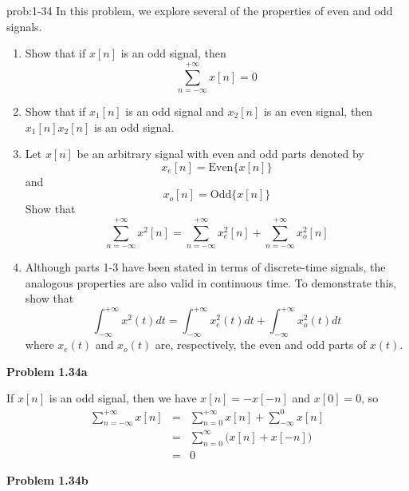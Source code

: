 \documentclass[koma,a4paper,utopia,12pt,listings-color,microtype,paralist,colorlinks,urlcolor=red]{org-article}
\begin{document}
\begin{prob}[]{prob:1-34}
In this problem, we explore several of the properties of even and odd
signals.

\begin{enumerate}
\item Show that if \(x[n]\) is an odd signal, then
\begin{equation*}
\sum_{n=-\infty}^{+\infty} x[n] =0
\end{equation*}
\item Show that if \(x_{1}[n]\) is an odd signal and \(x_{2}[n]\) is an even
signal, then \(x_{1}[n]x_{2}[n]\) is an odd signal.
\item Let \(x[n]\) be an arbitrary signal with even and odd parts denoted by
\begin{equation*}
x_{e}[n] = \mathrm{Even}\{ x[n] \}
\end{equation*}
and
\begin{equation*}
x_{o}[n] = \mathrm{Odd} \{ x[n] \}
\end{equation*}
Show that
\begin{equation*}
\sum_{n=-\infty}^{+\infty} x^{2}[n] = \sum_{n=-\infty}^{+\infty} x_{e}^{2}[n] +  \sum_{n=-\infty}^{+\infty} x_{o}^{2}[n]
\end{equation*}
\item Although parts 1-3 have been stated in terms of discrete-time
signals, the analogous properties are also valid in continuous time. To
demonstrate this, show that
\begin{equation*}
\int_{-\infty}^{+\infty}x^{2}(t)dt = \int_{-\infty}^{+\infty} x_{e}^{2}(t)dt + \int_{-\infty}^{+\infty} x_{o}^{2}(t)dt
\end{equation*}
where \(x_{e}(t)\) and \(x_{o}(t)\) are, respectively, the even and odd
parts of \(x(t)\).
\end{enumerate}
\label{prob:1-34}
\end{prob}

\textbf{Problem 1.34a}

If \(x[n]\) is an odd signal, then we have \(x[n] = -x[-n]\) and \(x[0]=0\), so
\begin{eqnarray*}
\sum_{n=-\infty}^{+\infty} x[n] &=& \sum_{n=0}^{+\infty} x[n] + \sum_{-\infty}^{0} x[n] \\
&=& \sum_{n=0}^{\infty} \big( x[n] + x[-n] \big)  \\
&=& 0
\end{eqnarray*}

\textbf{Problem 1.34b}
\end{document}
